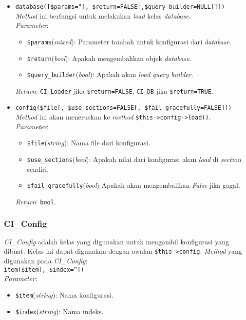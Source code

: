 \begin{itemize}
	\item \texttt{database([\$params="[, \$return=FALSE[,\$query\_builder=NULL]]])} \\
	\textit{Method} ini berfungsi untuk melakukan \textit{load} kelas \textit{database}. \\
	\textit{Parameter}:
	\begin{itemize}
		\item \texttt{\$params}(\textit{mixed}): Parameter tambah untuk konfigurasi dari \textit{database}. 
		\item \texttt{\$return}(\textit{bool}): Apakah mengembalikan objek \textit{database}.
		\item \texttt{\$query\_builder}(\textit{bool}): Apakah akan \textit{load} \textit{query builder}.		
	\end{itemize}
	\textit{Return}: \texttt{CI\_Loader} jika \texttt{\$return=FALSE}, \texttt{CI\_DB} jika \texttt{\$return=TRUE}.
	
	\item \texttt{config(\$file[, \$use\_sections=FALSE[, \$fail\_gracefully=FALSE]])} \\
	\textit{Method} ini akan meneruskan ke \textit{method} \texttt{\$this->config->load()}. \\ 
	\textit{Parameter}: 
	\begin{itemize} 
		\item \texttt{\$file}(\textit{string}): Nama file dari konfigurasi.
		\item \texttt{\$use\_sections}(\textit{bool}): Apakah nilai dari konfigurasi akan \textit{load} di \textit{section} sendiri.
		\item \texttt{\$fail\_gracefully}(\textit{bool}) Apakah akan mengembalikan \textit{False} jika gagal.
	\end{itemize}
	\textit{Return}: \texttt{bool}.
		
\end{itemize}

\subsubsection{CI\_Config}
\textit{CI\_Config} adalah kelas yang digunakan untuk mengambil konfigurasi yang dibuat. Kelas ini dapat digunakan dengan awalan \texttt{\$this->config}. \textit{Method} yang digunakan pada \textit{CI\_Config}: \\
\texttt{item(\$item[, \$index=''])} \\
\textit{Parameter}: 
\begin{itemize} 
	\item \texttt{\$item}(\textit{string}): Nama konfigurasi.
	\item \texttt{\$index}(\textit{string}): Nama indeks.
\end{itemize}

